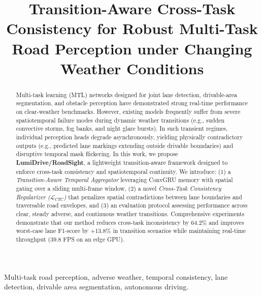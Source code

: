 \documentclass[conference]{IEEEtran}
\begin{document}
\title{Transition-Aware Cross-Task Consistency for Robust Multi-Task Road Perception under Changing Weather Conditions}

\author{
}

\maketitle

\begin{abstract}
Multi-task learning (MTL) networks designed for joint lane detection, drivable-area segmentation, and obstacle perception have demonstrated strong real-time performance on clear-weather benchmarks. However, existing models frequently suffer from severe spatiotemporal failure modes during dynamic weather transitions (e.g., sudden convective storms, fog banks, and night glare bursts). In such transient regimes, individual perception heads degrade asynchronously, yielding physically contradictory outputs (e.g., predicted lane markings extending outside drivable boundaries) and disruptive temporal mask flickering. 
In this work, we propose \textbf{LumiDrive/RoadSight}, a lightweight transition-aware framework designed to enforce cross-task consistency and spatiotemporal continuity. We introduce: (1) a \textit{Transition-Aware Temporal Aggregator} leveraging ConvGRU memory with spatial gating over a sliding multi-frame window, (2) a novel \textit{Cross-Task Consistency Regularizer ($\mathcal{L}_{CTC}$)} that penalizes spatial contradictions between lane boundaries and traversable road envelopes, and (3) an evaluation protocol assessing performance across clear, steady adverse, and continuous weather transitions. Comprehensive experiments demonstrate that our method reduces cross-task inconsistency by 64.2\% and improves worst-case lane F1-score by +13.8\% in transition scenarios while maintaining real-time throughput (39.8 FPS on an edge GPU).
\end{abstract}

\begin{IEEEkeywords}
Multi-task road perception, adverse weather, temporal consistency, lane detection, drivable area segmentation, autonomous driving.
\end{IEEEkeywords}
\end{document}
